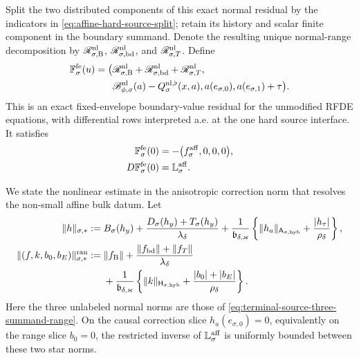 \begin{theorem}
Split the two distributed components of this exact normal residual by
the indicators in \cref{eq:affine-hard-source-split}; retain its history
and scalar finite component in the boundary summand.  Denote the resulting
unique normal-range decomposition by
\(\mathscr R_{\sigma,\rm B}^{\rm nl}\),
\(\mathscr R_{\sigma,\rm bd}^{\rm nl}\), and
\(\mathscr R_{\sigma,T}^{\rm nl}\).  Define
\begin{align}
 \mathbb F_\sigma^{\rm fe}(u)
 =\bigl(&\mathscr R_{\sigma,\rm B}^{\rm nl}
          +\mathscr R_{\sigma,\rm bd}^{\rm nl}
          +\mathscr R_{\sigma,T}^{\rm nl},\notag\\
 &\mathscr B_{\phi,\sigma}^{\rm nl}(a)
       -Q_\sigma^{\rm nl,\flat}(x,a),
   a(e_{\sigma,0}),a(e_{\sigma,1})+\tau\bigr).  \label{eq:fixed-envelope-exact-residual}
\end{align}
This is an exact fixed-envelope boundary-value residual for the unmodified
RFDE equations, with differential rows interpreted a.e. at the one hard
source interface.  It satisfies
\begin{align}
 \mathbb F_\sigma^{\rm fe}(0)
 &=-\bigl(f_\sigma^{\rm aff},0,0,0\bigr),\notag\\
 D\mathbb F_\sigma^{\rm fe}(0)
 &=\mathbb L_\sigma^{\rm aff}.                  \label{eq:fixed-envelope-base-and-linearization}
\end{align}

We state the nonlinear estimate in the anisotropic correction norm that
resolves the non-small affine bulk datum.  Let
\begin{align}
 \|h\|_{\sigma,*}
 :={}&B_\sigma(h_y)
 +\frac{D_\sigma(h_y)+T_\sigma(h_y)}{\lambda_\delta}
 +\frac1{\mathfrak b_{\delta,\varkappa}}
   \left\{\|h_a\|_{\mathsf A_{\sigma,\mathrm{hyb}}}
          +\frac{|h_\tau|}{\rho_\delta}\right\},          \label{eq:fixed-envelope-star-domain-norm}\\
 \|(f,k,b_0,b_E)\|_{\sigma,*}^{\rm ran}
 :={}&\|f_{\rm B}\|+\frac{\|f_{\rm bd}\|+\|f_T\|}
                                  {\lambda_\delta}\notag\\
 &+\frac1{\mathfrak b_{\delta,\varkappa}}
   \left\{\|k\|_{\mathsf H_{\sigma,\mathrm{hyb}}}
       +\frac{|b_0|+|b_E|}{\rho_\delta}\right\}.          \label{eq:fixed-envelope-star-range-norm}
\end{align}
Here the three unlabeled normal norms are those of
\cref{eq:terminal-source-three-summand-range}.  On the causal correction
slice \(h_a(e_{\sigma,0})=0\), equivalently on the range slice \(b_0=0\),
the restricted inverse of \(\mathbb L_\sigma^{\rm aff}\) is uniformly
bounded between these two star norms.


\end{theorem}
